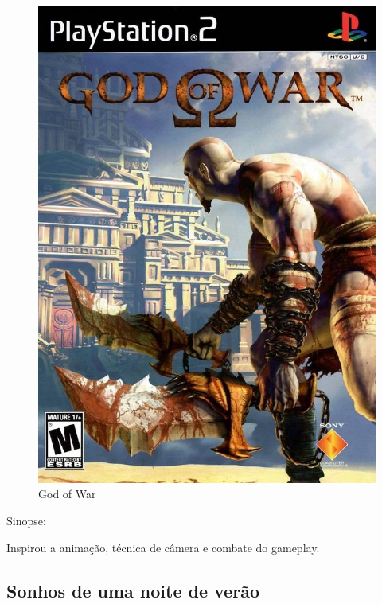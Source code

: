 \begin{figure}[htb]
	\caption{\label{god_of_war}God of War}
	\begin{center}
	    \includegraphics[width=\textwidth/2]{imagens/GodofWar.jpg}
	\end{center}
\end{figure}
Sinopse:

Inspirou a animação, técnica de câmera e combate do gameplay.

\subsection{Sonhos de uma noite de verão}

